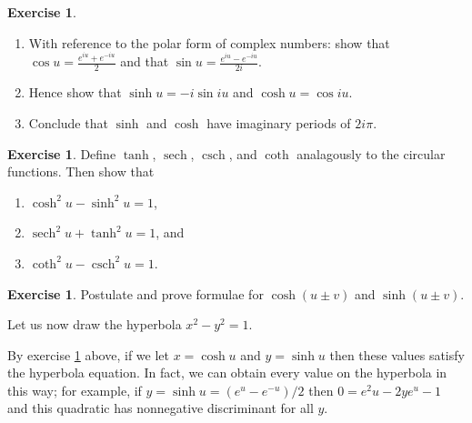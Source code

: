 \documentclass[a4paper,leqno]{article}
\numberwithin{equation}{section}
\theoremstyle{definition}
\newtheorem{exercise}[equation]{Exercise}
\theoremstyle{remark}
\DeclareMathOperator{\sech}{sech}
\DeclareMathOperator{\csch}{csch}
\begin{document}
\begin{exercise}\leavevmode
  \begin{enumerate}
    \item With reference to the polar form of complex numbers: show that $ \cos u = \frac{e^{iu} + e^{-iu}}{2} $ and
          that $ \sin u = \frac{e^{iu} - e^{-iu}}{2i} $.
    \item Hence show that $ \sinh u = -i \sin iu $ and $ \cosh u = \cos iu $.
    \item Conclude that $ \sinh $ and $ \cosh $ have imaginary periods of $ 2i\pi $.
  \end{enumerate}
\end{exercise}

\begin{exercise}\label{ex:hyperidentities}
  Define $ \tanh $, $ \sech $, $ \csch $, and $ \coth $ analagously to the circular functions. Then show that
  \begin{enumerate}
    \item $ \cosh^2 u - \sinh^2 u = 1 $,
    \item $ \sech^2 u + \tanh^2 u = 1 $, and
    \item $ \coth^2 u - \csch^2 u = 1 $.
  \end{enumerate}
\end{exercise}

\begin{exercise}
  Postulate and prove formulae for $ \cosh(u \pm v) $ and $ \sinh(u \pm v) $.
\end{exercise}

Let us now draw the hyperbola $ x^2 - y^2 = 1 $.
\begin{center}
\end{center}

By exercise \ref{ex:hyperidentities} above, if we let $ x = \cosh u $ and $ y = \sinh u $ then these
values satisfy the hyperbola equation. In fact, we can obtain every value on the hyperbola in this way;
for example, if $ y = \sinh u = (e^u - e^{-u})/2 $ then $ 0 = e^2u - 2ye^u - 1 $ and this quadratic
has nonnegative discriminant for all $ y $.
\end{document}
